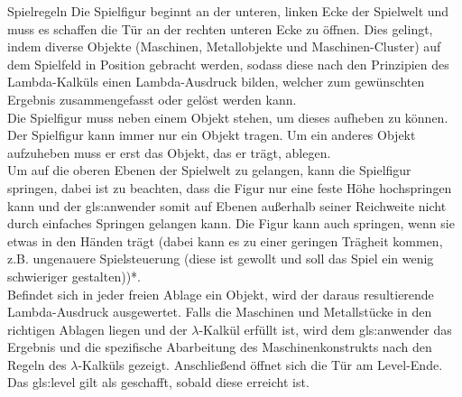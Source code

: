 \documentclass{scrartcl}
\begin{document}
\begin{description}

\begin{minipage}{1\textwidth}
	\item[Spielregeln] \label{spielaufbau:Spielregeln} 
	Die Spielfigur beginnt an der unteren, linken Ecke der Spielwelt und muss es schaffen die Tür an der rechten unteren Ecke zu öffnen. Dies gelingt, indem diverse Objekte (Maschinen, Metallobjekte und Maschinen-Cluster) auf dem Spielfeld in Position gebracht werden, sodass diese nach den Prinzipien des Lambda-Kalküls einen Lambda-Ausdruck bilden, welcher zum gewünschten Ergebnis zusammengefasst oder gelöst werden kann.\\
	Die Spielfigur muss neben einem Objekt stehen, um dieses aufheben zu können.\\
	Der Spielfigur kann immer nur ein Objekt tragen. Um ein anderes Objekt aufzuheben muss er erst das Objekt, das er trägt, ablegen.\\
	Um auf die oberen Ebenen der Spielwelt zu gelangen, kann die Spielfigur springen, dabei ist zu beachten, dass die Figur nur eine feste Höhe hochspringen kann und der \gls{gls:anwender} somit auf Ebenen außerhalb seiner Reichweite nicht durch einfaches Springen gelangen kann. Die Figur kann auch springen, wenn sie etwas in den Händen trägt (dabei kann es zu einer geringen Trägheit kommen, z.B. ungenauere Spielsteuerung (diese ist gewollt und soll das Spiel ein wenig schwieriger gestalten))*.\\
	Befindet sich in jeder freien Ablage ein Objekt, wird der daraus resultierende Lambda-Ausdruck ausgewertet. Falls die Maschinen und Metallstücke in den richtigen Ablagen liegen und der $\lambda$-Kalkül erfüllt ist, wird dem \gls{gls:anwender} das Ergebnis und die spezifische Abarbeitung des Maschinenkonstrukts nach den Regeln des $\lambda$-Kalküls gezeigt. Anschließend öffnet sich die Tür am Level-Ende. Das \gls{gls:level} gilt als geschafft, sobald diese erreicht ist.\\
	
\end{minipage}


\end{description}
\end{document}

